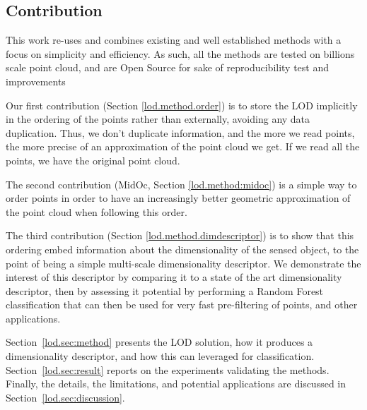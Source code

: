 \subsection{Contribution}

	This work re-uses and combines existing and well established methods with a focus on simplicity and efficiency. As such, all the methods are tested on billions scale point cloud, and are Open Source for sake of reproducibility test and improvements
	
	
	Our first contribution (Section \ref{lod.method.order}) is to store the LOD implicitly in the ordering of the points rather than externally, avoiding any data duplication.
	Thus, we don't duplicate information, and the more we read points, the more precise of an approximation of the point cloud we get. If we read all the points, we have the original point cloud.
	
	The second contribution (MidOc, Section \ref{lod.method:midoc}) is a simple way to order points in order to have an increasingly better geometric approximation of the point cloud when following this order.
	
	The third contribution (Section \ref{lod.method.dimdescriptor}) is to show that this ordering embed information about the dimensionality of the sensed object,
	to the point of being a simple multi-scale dimensionality descriptor.
	We demonstrate the interest of this descriptor by comparing it to a state of the art dimensionality descriptor, then by assessing it potential by performing a Random Forest classification that can then be used for very fast pre-filtering of points, and other applications.
		
	
	Section~\ref{lod.sec:method} presents the LOD solution, how it produces a dimensionality descriptor, and how this can leveraged for classification.  
	Section~\ref{lod.sec:result} reports on the experiments validating the methods.
	Finally, the details, the limitations, and potential applications are discussed in Section~\ref{lod.sec:discussion}.
	
